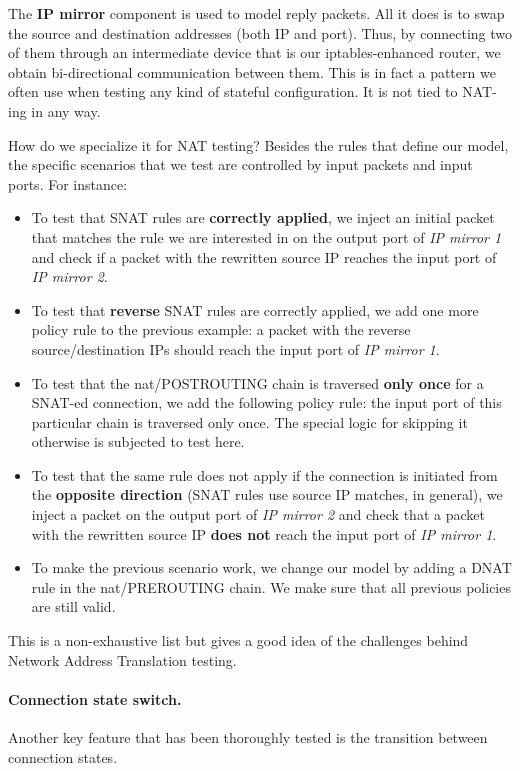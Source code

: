 The \textbf{IP mirror} component is used to model reply packets.  All it does
is to swap the source and destination addresses (both IP and port).  Thus, by
connecting two of them through an intermediate device that is our
iptables-enhanced router, we obtain bi-directional communication between them.
This is in fact a pattern we often use when testing any kind of stateful
configuration.  It is not tied to NAT-ing in any way.

How do we specialize it for NAT testing?  Besides the rules that define our
model, the specific scenarios that we test are controlled by input packets and
input ports.  For instance:
\begin{itemize}
  \item To test that SNAT rules are \textbf{correctly applied}, we inject an
    initial packet that matches the rule we are interested in on the output
    port of \emph{IP mirror 1} and check if a packet with the rewritten source
    IP reaches the input port of \emph{IP mirror 2}.
  \item To test that \textbf{reverse} SNAT rules are correctly applied, we add
    one more policy rule to the previous example: a packet with the reverse
    source/destination IPs should reach the input port of \emph{IP mirror 1}.
  \item To test that the nat/POSTROUTING chain is traversed \textbf{only once}
    for a SNAT-ed connection, we add the following policy rule: the input port
    of this particular chain is traversed only once.  The special logic for
    skipping it otherwise is subjected to test here.
  \item To test that the same rule does not apply if the connection is
    initiated from the \textbf{opposite direction} (SNAT rules use source IP
    matches, in general), we inject a packet on the output port of \emph{IP
    mirror 2} and check that a packet with the rewritten source IP \textbf{does
    not} reach the input port of \emph{IP mirror 1}.
  \item To make the previous scenario work, we change our model by adding a
    DNAT rule in the nat/PREROUTING chain.  We make sure that all previous
    policies are still valid.
\end{itemize}

This is a non-exhaustive list but gives a good idea of the challenges behind
Network Address Translation testing.

\paragraph{Connection state switch.}
Another key feature that has been thoroughly tested is the transition between
connection states.

